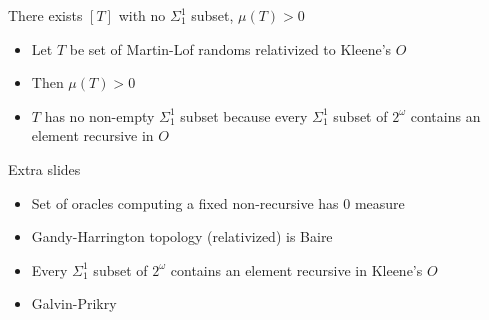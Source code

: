 \begin{frame}{There exists $[T]$ with no $\Sigma_1^1$ subset, $\mu(T)>0$}
  \begin{itemize}
    \item Let $T$ be set of Martin-Lof randoms relativized to Kleene's $O$
    \item Then $\mu(T)>0$
    \item $T$ has no non-empty $\Sigma_1^1$ subset because every
      $\Sigma_1^1$ subset of $2^\omega$ contains an element recursive in
      $O$
  \end{itemize}
\end{frame}

\begin{frame}{Extra slides}
  \begin{itemize}
    \item Set of oracles computing a fixed non-recursive has 0 measure
    \item Gandy-Harrington topology (relativized) is Baire
    \item Every $\Sigma_1^1$ subset of $2^\omega$ contains an element
      recursive in Kleene's $O$
    \item Galvin-Prikry
  \end{itemize}
\end{frame}
